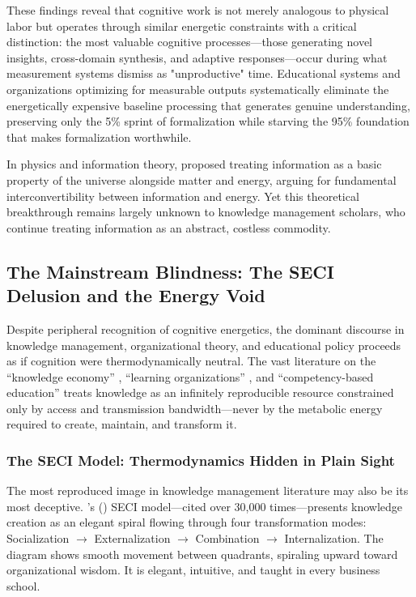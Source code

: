 These findings reveal that cognitive work is not merely analogous to physical labor but operates through similar energetic constraints with a critical distinction: the most valuable cognitive processes—those generating novel insights, cross-domain synthesis, and adaptive responses—occur during what measurement systems dismiss as "unproductive" time. Educational systems and organizations optimizing for measurable outputs systematically eliminate the energetically expensive baseline processing that generates genuine understanding, preserving only the 5\% sprint of formalization while starving the 95\% foundation that makes formalization worthwhile.

In physics and information theory, \citet{stonier1996} proposed treating information as a basic property of the universe alongside matter and energy, arguing for fundamental interconvertibility between information and energy. Yet this theoretical breakthrough remains largely unknown to knowledge management scholars, who continue treating information as an abstract, costless commodity.

\subsection{The Mainstream Blindness: The SECI Delusion and the Energy Void}

Despite peripheral recognition of cognitive energetics, the dominant discourse in knowledge management, organizational theory, and educational policy proceeds as if cognition were thermodynamically neutral. The vast literature on the ``knowledge economy'' \citep{powell2004knowledge}, ``learning organizations'' \citep{senge1990}, and ``competency-based education'' \citep{mulder2007competency} treats knowledge as an infinitely reproducible resource constrained only by access and transmission bandwidth---never by the metabolic energy required to create, maintain, and transform it.

\subsubsection{The SECI Model: Thermodynamics Hidden in Plain Sight}

The most reproduced image in knowledge management literature may also be its most deceptive. \citeauthor{nonaka1995knowledge}'s (\citeyear{nonaka1995knowledge}) SECI model---cited over 30,000 times---presents knowledge creation as an elegant spiral flowing through four transformation modes: Socialization $\rightarrow$ Externalization $\rightarrow$ Combination $\rightarrow$ Internalization. The diagram shows smooth movement between quadrants, spiraling upward toward organizational wisdom. It is elegant, intuitive, and taught in every business school.


